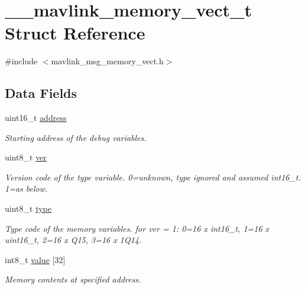 \hypertarget{struct____mavlink__memory__vect__t}{\section{\+\_\+\+\_\+mavlink\+\_\+memory\+\_\+vect\+\_\+t Struct Reference}
\label{struct____mavlink__memory__vect__t}
}


{\ttfamily \#include $<$mavlink\+\_\+msg\+\_\+memory\+\_\+vect.\+h$>$}

\subsection*{Data Fields}
\begin{DoxyCompactItemize}
\item 
uint16\+\_\+t \hyperlink{struct____mavlink__memory__vect__t_a079a0cecfd6f6e3d47c4c1d324ddd29d}{address}
\begin{DoxyCompactList}\small\item\em Starting address of the debug variables. \end{DoxyCompactList}\item 
uint8\+\_\+t \hyperlink{struct____mavlink__memory__vect__t_acb180cded1d3dcbf3e719545b50f392e}{ver}
\begin{DoxyCompactList}\small\item\em Version code of the type variable. 0=unknown, type ignored and assumed int16\+\_\+t. 1=as below. \end{DoxyCompactList}\item 
uint8\+\_\+t \hyperlink{struct____mavlink__memory__vect__t_a5c37b4f5d396209693c7bb32097a6e88}{type}
\begin{DoxyCompactList}\small\item\em Type code of the memory variables. for ver = 1\+: 0=16 x int16\+\_\+t, 1=16 x uint16\+\_\+t, 2=16 x Q15, 3=16 x 1\+Q14. \end{DoxyCompactList}\item 
int8\+\_\+t \hyperlink{struct____mavlink__memory__vect__t_a9d2124dfb0efc698eff93eb6744654cf}{value} \mbox{[}32\mbox{]}
\begin{DoxyCompactList}\small\item\em Memory contents at specified address. \end{DoxyCompactList}\end{DoxyCompactItemize}


